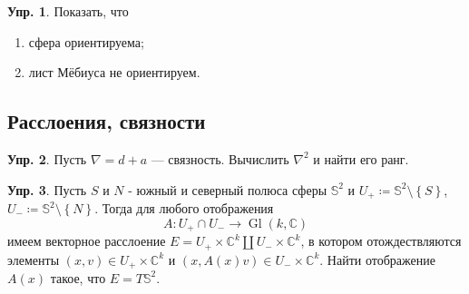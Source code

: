 \documentclass[a4paper, 12pt]{article}
\theoremstyle{definition}
\newtheorem{exercise}{Упр.}
\begin{document}
\begin{exercise}
    Показать, что
    \begin{enumerate}
        \item сфера ориентируема;
        \item лист Мёбиуса не ориентируем.
    \end{enumerate}
\end{exercise}

\subsection{Расслоения, связности}

\begin{exercise}
    Пусть \({ \nabla = d + a }\) --- связность. Вычислить \({ \nabla^2 }\) и найти его ранг.
\end{exercise}

\begin{exercise}
    Пусть \({ S }\) и \({ N }\) - южный и северный полюса сферы \({ \mathbb S^2 }\) и \({ U_{+} \coloneqq \mathbb S^2 \setminus \left\{ S \right\} }\), \({ U_{-} \coloneqq \mathbb S^2 \setminus \left\{ N \right\} }\). Тогда для любого отображения \[
        A : U_+ \cap U_- \to \operatorname{Gl}(k, \mathbb C)
    \]
    имеем векторное расслоение \({ E = U_+ \times \mathbb C^{k} \amalg U_- \times \mathbb C^{k} }\), в котором отождествляются элементы \({ (x, v) \in U_+ \times \mathbb C^{k} }\) и \({ (x, A(x)v) \in U_- \times \mathbb C^{k} }\). Найти отображение \({ A(x) }\) такое, что \({ E = T \mathbb S^2 }\).
\end{exercise}
\end{document}
